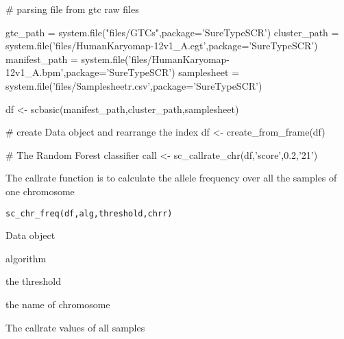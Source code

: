 \documentclass[a4paper]{book}
\begin{document}
\begin{Examples}
\begin{ExampleCode}

# parsing file from gtc raw files

gtc_path = system.file("files/GTCs",package='SureTypeSCR')
cluster_path = system.file('files/HumanKaryomap-12v1_A.egt',package='SureTypeSCR')
manifest_path = system.file('files/HumanKaryomap-12v1_A.bpm',package='SureTypeSCR')
samplesheet = system.file('files/Samplesheetr.csv',package='SureTypeSCR')

df <- scbasic(manifest_path,cluster_path,samplesheet)


# create Data object and rearrange the index
df <- create_from_frame(df)

# The Random Forest classifier
call <- sc_callrate_chr(df,'score',0.2,'21') 




\end{ExampleCode}
\end{Examples}
%
\begin{Description}\relax
The callrate function is to calculate the allele frequency over all the samples of one chromosome
\end{Description}
%
\begin{Usage}
\begin{verbatim}
sc_chr_freq(df,alg,threshold,chrr)
\end{verbatim}
\end{Usage}
%
\begin{Arguments}
\begin{ldescription}
\item[\code{df}] Data object
\item[\code{alg}] algorithm
\item[\code{threshold}] the threshold
\item[\code{chrr}] the name of chromosome
\end{ldescription}
\end{Arguments}
%
\begin{Value}
The callrate values of all samples 
\end{Value}
%
\end{document}
